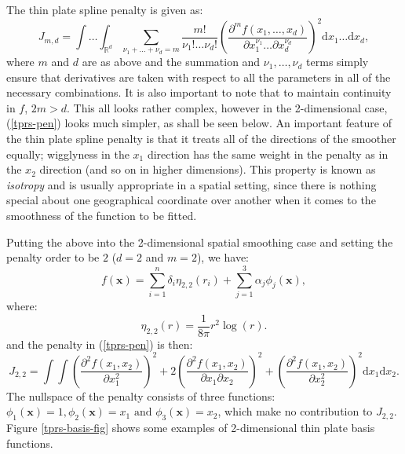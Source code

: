 The thin plate spline penalty is given as:
\begin{equation}
J_{m,d} = \int \ldots \int_{\mathbb{R}^d} \sum_{\nu_1 + \dots + \nu_d=m} \frac{m!}{\nu_1! \dots \nu_d!} \left ( \frac{\partial^m f(x_1,\dots,x_d)}{\partial x_1^{\nu_1} \ldots  \partial x_d^{\nu_d}} \right )^2 \text{d} x_1 \ldots  \text{d} x_d,
\label{tprs-pen}
\end{equation}
where $m$ and $d$ are as above and the summation and $\nu_1,\ldots,\nu_d$ terms simply ensure that derivatives are taken with respect to all the parameters in all of the necessary combinations. It is also important to note that to maintain continuity in $f$, $2m>d$. This all looks rather complex, however in the 2-dimensional case, (\ref{tprs-pen}) looks much simpler, as shall be seen below. An important feature of the thin plate spline penalty is that it treats all of the directions of the smoother equally; wigglyness in the $x_1$ direction has the same weight in the penalty as in the $x_2$ direction (and so on in higher dimensions). This property is known as \textit{isotropy} and is usually appropriate in a spatial setting, since there is nothing special about one geographical coordinate over another when it comes to the smoothness of the function to be fitted.

Putting the above into the 2-dimensional spatial smoothing case and setting the penalty order to be $2$ ($d=2$ and $m=2$), we have:
\begin{equation*}
f(\mathbf{x}) = \sum_{i=1}^n \delta_i \eta_{2,2}(r_i) + \sum_{j=1}^3 \alpha_j \phi_j(\mathbf{x}),
\end{equation*}
where:
\begin{equation*}
\eta_{2,2}(r) = \frac{1}{8\pi} r^2 \log(r).
\end{equation*}
and the penalty in (\ref{tprs-pen}) is then:
\begin{equation*}
J_{2,2} = \int \int \left ( \frac{\partial^2 f(x_1,x_2)}{\partial x_1^2} \right )^2 + 2\left ( \frac{\partial^2 f(x_1,x_2)}{\partial x_1  \partial x_2} \right )^2 + \left ( \frac{\partial^2 f(x_1,x_2)}{\partial x_2^2} \right )^2 \text{d} x_1 \text{d} x_2.
\end{equation*}
The nullspace of the penalty consists of three functions: $\phi_1(\mathbf{x})=1, \phi_2(\mathbf{x})=x_1 \text{ and } \phi_3(\mathbf{x})=x_2$, which make no contribution to $J_{2,2}$. Figure \ref{tprs-basis-fig} shows some examples of 2-dimensional thin plate basis functions.



